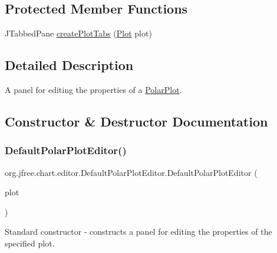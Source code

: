 \subsection*{Protected Member Functions}
\begin{DoxyCompactItemize}
\item 
J\+Tabbed\+Pane \mbox{\hyperlink{classorg_1_1jfree_1_1chart_1_1editor_1_1_default_polar_plot_editor_a88e60406edc0205ce896950b0df93e9b}{create\+Plot\+Tabs}} (\mbox{\hyperlink{classorg_1_1jfree_1_1chart_1_1plot_1_1_plot}{Plot}} plot)
\end{DoxyCompactItemize}


\subsection{Detailed Description}
A panel for editing the properties of a \mbox{\hyperlink{}{Polar\+Plot}}. 

\subsection{Constructor \& Destructor Documentation}
\mbox{\label{classorg_1_1jfree_1_1chart_1_1editor_1_1_default_polar_plot_editor_a92ebc11554ea838e5afd4c43f7a63bcc}} 
\subsubsection{\texorpdfstring{Default\+Polar\+Plot\+Editor()}{DefaultPolarPlotEditor()}}
{\footnotesize\ttfamily org.\+jfree.\+chart.\+editor.\+Default\+Polar\+Plot\+Editor.\+Default\+Polar\+Plot\+Editor (\begin{DoxyParamCaption}\item[{\mbox{\hyperlink{classorg_1_1jfree_1_1chart_1_1plot_1_1_polar_plot}{Polar\+Plot}}}]{plot }\end{DoxyParamCaption})}

Standard constructor -\/ constructs a panel for editing the properties of the specified plot.


